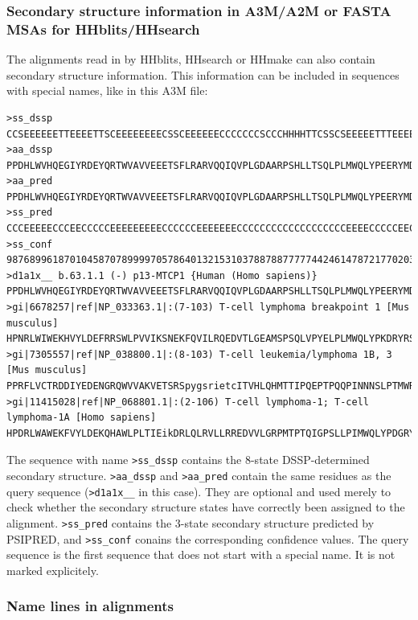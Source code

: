 \documentclass[11pt,a4paper]{article}
\begin{document}
\subsubsection*{Secondary structure information in A3M/A2M or FASTA MSAs for HHblits/HHsearch}

The alignments read in by HHblits, HHsearch or HHmake can also contain secondary structure 
information. This information can be included in sequences with special names, 
like in this A3M file:

\scriptsize\begin{verbatim}
>ss_dssp
CCSEEEEEETTEEEETTSCEEEEEEEECSSCEEEEEECCCCCCCSCCCHHHHTTCSSCSEEEEETTTEEEETTSC
>aa_dssp
PPDHLWVHQEGIYRDEYQRTWVAVVEEETSFLRARVQQIQVPLGDAARPSHLLTSQLPLMWQLYPEERYMDNNSR
>aa_pred 
PPDHLWVHQEGIYRDEYQRTWVAVVEEETSFLRARVQQIQVPLGDAARPSHLLTSQLPLMWQLYPEERYMDNNSR
>ss_pred 
CCCEEEEECCCEECCCCCEEEEEEEEECCCCCCEEEEEEECCCCCCCCCCCCCCCCCCCEEEECCCCCEECCCCC
>ss_conf 
987689961870104587078999970578640132153103788788777774424614787217702035631
>d1a1x__ b.63.1.1 (-) p13-MTCP1 {Human (Homo sapiens)}
PPDHLWVHQEGIYRDEYQRTWVAVVEEETSFLRARVQQIQVPLGDAARPSHLLTSQLPLMWQLYPEERYMDNNSR
>gi|6678257|ref|NP_033363.1|:(7-103) T-cell lymphoma breakpoint 1 [Mus musculus]
HPNRLWIWEKHVYLDEFRRSWLPVVIKSNEKFQVILRQEDVTLGEAMSPSQLVPYELPLMWQLYPKDRYRSCDSM
>gi|7305557|ref|NP_038800.1|:(8-103) T-cell leukemia/lymphoma 1B, 3 [Mus musculus]
PPRFLVCTRDDIYEDENGRQWVVAKVETSRSpygsrietcITVHLQHMTTIPQEPTPQQPINNNSLPTMWRLESMNTYTGTDGT
>gi|11415028|ref|NP_068801.1|:(2-106) T-cell lymphoma-1; T-cell lymphoma-1A [Homo sapiens]
HPDRLWAWEKFVYLDEKQHAWLPLTIEikDRLQLRVLLRREDVVLGRPMTPTQIGPSLLPIMWQLYPDGRYRSSDSS
\end{verbatim}\normalsize

The sequence with name \verb`>ss_dssp` contains the 8-state DSSP-determined secondary
structure. \verb`>aa_dssp` and \verb`>aa_pred` contain the same residues as the query 
sequence (\verb`>d1a1x__` in this case). They are optional and used merely to check whether the 
secondary structure states have correctly been assigned to the alignment. \verb`>ss_pred` 
contains the 3-state secondary structure predicted by PSIPRED, and \verb`>ss_conf`
 conains the corresponding confidence values. The query sequence is the first sequence that 
does not start with a special name. It is not marked explicitely.


\subsubsection*{Name lines in alignments}
\end{document}

